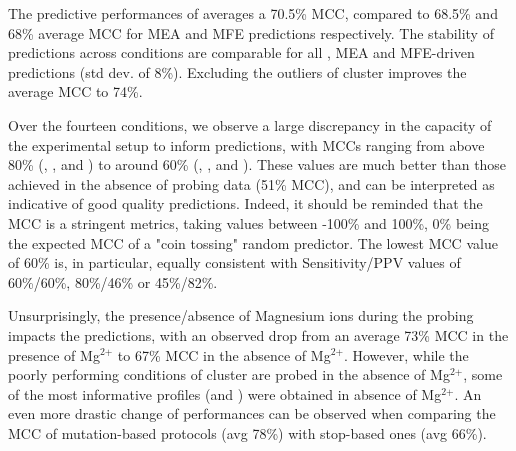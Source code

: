 \documentclass[a4,center,fleqn]{NAR}
\begin{document}
The predictive performances of \OurTool averages a 70.5\% MCC, compared to 68.5\% and 68\% average MCC for MEA and MFE predictions respectively. The stability of predictions across conditions are comparable for all \OurTool, MEA and MFE-driven predictions (std dev. of 8\%). Excluding the outliers of cluster  improves the average MCC to 74\%.

Over the fourteen conditions, we observe a large discrepancy in the capacity of the experimental setup to inform predictions, with MCCs ranging from above 80\% (\NMIA, \NMIAMg, \OneMSevILU and \OneMSevILUMg) to around 60\% (\NAICE, \BzCN, \OneMSevCE and \NMIACE). These values are much better than those achieved in the absence of probing data (51\% MCC), and can be interpreted as indicative of good quality predictions. Indeed, it should be reminded that the MCC is a stringent metrics, taking values between -100\% and 100\%, 0\% being the expected MCC of a "coin tossing" random predictor. The lowest MCC value of 60\% is, in particular, equally consistent with Sensitivity/PPV values of 60\%/60\%, 80\%/46\% or 45\%/82\%.

Unsurprisingly, the presence/absence of Magnesium ions during the probing impacts the predictions, with an observed drop from an average 73\% MCC in the presence of Mg$^\text{2+}$ to 67\% MCC in the absence of Mg$^\text{2+}$. However, while the poorly performing conditions of cluster  are probed in the absence of Mg$^\text{2+}$, some of the most informative profiles (\OneMSevILU and \NMIA) were obtained in absence of Mg$^\text{2+}$.
An even more drastic change of performances can be observed when comparing the MCC of mutation-based protocols (avg 78\%) with stop-based ones (avg 66\%). 
\end{document}

